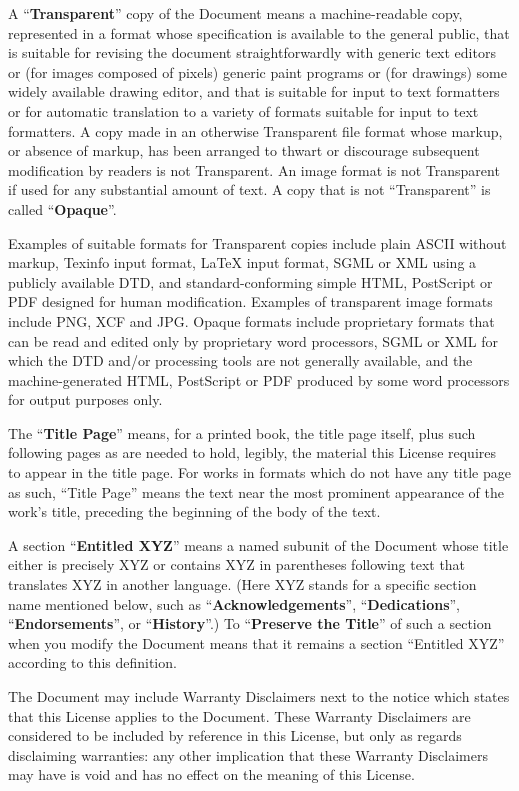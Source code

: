 \documentclass[a4paper,spanish,12pt]{book}
\begin{document}
A ``\textbf{Transparent}'' copy of the Document means a machine-readable copy,
represented in a format whose specification is available to the
general public, that is suitable for revising the document
straightforwardly with generic text editors or (for images composed of
pixels) generic paint programs or (for drawings) some widely available
drawing editor, and that is suitable for input to text formatters or
for automatic translation to a variety of formats suitable for input
to text formatters.  A copy made in an otherwise Transparent file
format whose markup, or absence of markup, has been arranged to thwart
or discourage subsequent modification by readers is not Transparent.
An image format is not Transparent if used for any substantial amount
of text.  A copy that is not ``Transparent'' is called ``\textbf{Opaque}''.

Examples of suitable formats for Transparent copies include plain
ASCII without markup, Texinfo input format, LaTeX input format, SGML
or XML using a publicly available DTD, and standard-conforming simple
HTML, PostScript or PDF designed for human modification.  Examples of
transparent image formats include PNG, XCF and JPG.  Opaque formats
include proprietary formats that can be read and edited only by
proprietary word processors, SGML or XML for which the DTD and/or
processing tools are not generally available, and the
machine-generated HTML, PostScript or PDF produced by some word
processors for output purposes only.

The ``\textbf{Title Page}'' means, for a printed book, the title page itself,
plus such following pages as are needed to hold, legibly, the material
this License requires to appear in the title page.  For works in
formats which do not have any title page as such, ``Title Page'' means
the text near the most prominent appearance of the work's title,
preceding the beginning of the body of the text.

A section ``\textbf{Entitled XYZ}'' means a named subunit of the Document whose
title either is precisely XYZ or contains XYZ in parentheses following
text that translates XYZ in another language.  (Here XYZ stands for a
specific section name mentioned below, such as ``\textbf{Acknowledgements}'',
``\textbf{Dedications}'', ``\textbf{Endorsements}'', or ``\textbf{History}''.)  
To ``\textbf{Preserve the Title}''
of such a section when you modify the Document means that it remains a
section ``Entitled XYZ'' according to this definition.

The Document may include Warranty Disclaimers next to the notice which
states that this License applies to the Document.  These Warranty
Disclaimers are considered to be included by reference in this
License, but only as regards disclaiming warranties: any other
implication that these Warranty Disclaimers may have is void and has
no effect on the meaning of this License.
\end{document}
